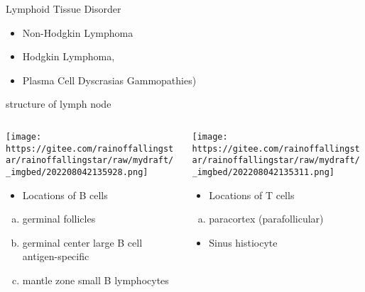 \documentclass[
  ignorenonframetext,
]{beamer}
\providecommand{\tightlist}{%
  \setlength{\itemsep}{0pt}\setlength{\parskip}{0pt}}
\begin{document}
\begin{frame}
\begin{block}{Lymphoid Tissue Disorder}
\protect\hypertarget{lymphoid-tissue-disorder}{}
\begin{itemize}
\item
  Non-Hodgkin Lymphoma
\item
  Hodgkin Lymphoma,
\item
  Plasma Cell Dyscrasias Gammopathies)
\end{itemize}
\end{block}
\end{frame}

\begin{frame}
\begin{block}{structure of lymph node}
\protect\hypertarget{structure-of-lymph-node}{}
\begin{columns}[T]
\begin{column}{0.5\textwidth}
\texttt{[image: https://gitee.com/rainoffallingstar/rainoffallingstar/raw/mydraft/\_imgbed/202208042135928.png]}

\begin{itemize}
\tightlist
\item
  Locations of B cells
\end{itemize}

\begin{enumerate}
[a.]
\item
  germinal follicles
\item
  germinal center large B cell antigen-specific
\item
  mantle zone small B lymphocytes
\end{enumerate}
\end{column}

\begin{column}{0.5\textwidth}
\texttt{[image: https://gitee.com/rainoffallingstar/rainoffallingstar/raw/mydraft/\_imgbed/202208042135311.png]}

\begin{itemize}
\tightlist
\item
  Locations of T cells
\end{itemize}

\begin{enumerate}
[a.]
\tightlist
\item
  paracortex (parafollicular)
\end{enumerate}

\begin{itemize}
\tightlist
\item
  Sinus histiocyte
\end{itemize}
\end{column}
\end{columns}
\end{block}
\end{frame}
\end{document}
